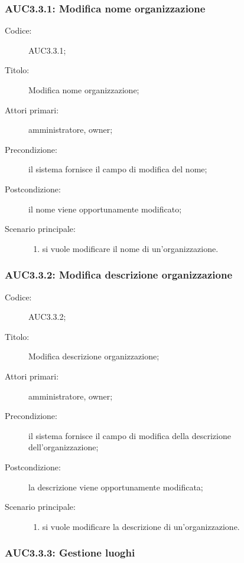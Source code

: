 \documentclass[../../../analisi-dei-requisiti.tex]{subfiles}
\begin{document}
\subsubsection{AUC3.3.1: Modifica nome organizzazione}%
\label{subs:AUC3.3.1}
\begin{description}
  \item[Codice:] AUC3.3.1;
  \item[Titolo:] Modifica nome organizzazione;
  \item[Attori primari:] amministratore, owner;
  \item[Precondizione:] il sistema fornisce il campo di modifica del nome;
  \item[Postcondizione:] il nome viene opportunamente modificato;
  \item[Scenario principale:]
        \begin{enumerate}
          \item si vuole modificare il nome di un'organizzazione.
        \end{enumerate}
\end{description}

\subsubsection{AUC3.3.2: Modifica descrizione organizzazione}%
\label{subs:AUC3.3.2}
\begin{description}
  \item[Codice:] AUC3.3.2;
  \item[Titolo:] Modifica descrizione organizzazione;
  \item[Attori primari:] amministratore, owner;
  \item[Precondizione:] il sistema fornisce il campo di modifica della descrizione dell'organizzazione;
  \item[Postcondizione:] la descrizione viene opportunamente modificata;
  \item[Scenario principale:]
        \begin{enumerate}
          \item si vuole modificare la descrizione di un'organizzazione.
        \end{enumerate}
\end{description}


\subsubsection{AUC3.3.3: Gestione luoghi}%
\label{subs:AUC3.3.3}
\end{document}
